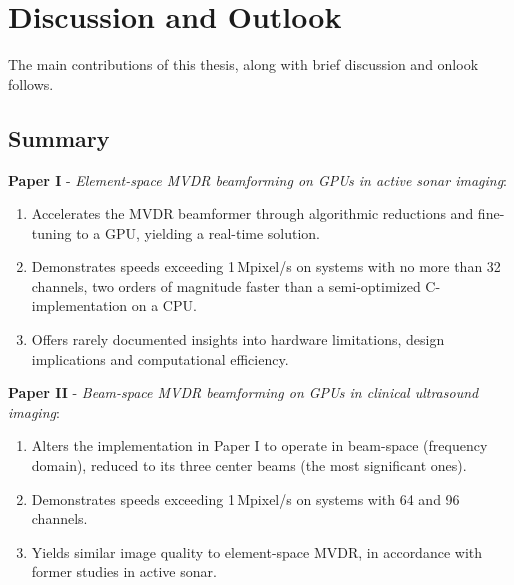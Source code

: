 
\endofdump

\ifRootBuild\else
  
  \makeglossaries
\fi



\chapter{Discussion and Outlook}

The main contributions of this thesis, along with brief discussion and onlook follows.

\section{Summary}

\textbf{Paper I} - \textit{Element-space MVDR beamforming on GPUs in active sonar imaging}:
\begin{enumerate}
\item Accelerates the MVDR beamformer through algorithmic reductions and fine-tuning to a GPU, yielding a real-time solution.
\item Demonstrates speeds exceeding 1\,Mpixel/s on systems with no more than 32 channels, two orders of magnitude faster than a semi-optimized C-implementation on a CPU.
\item Offers rarely documented insights into hardware limitations, design implications and computational efficiency.
\end{enumerate}

\textbf{Paper II} - \textit{Beam-space MVDR beamforming on GPUs in clinical ultrasound imaging}:
\begin{enumerate}
\item Alters the implementation in Paper I to operate in beam-space (frequency domain), reduced to its three center beams (the most significant ones).
\item Demonstrates speeds exceeding 1\,Mpixel/s on systems with 64 and 96 channels.
\item Yields similar image quality to element-space MVDR, in accordance with former studies in active sonar.
\end{enumerate}

